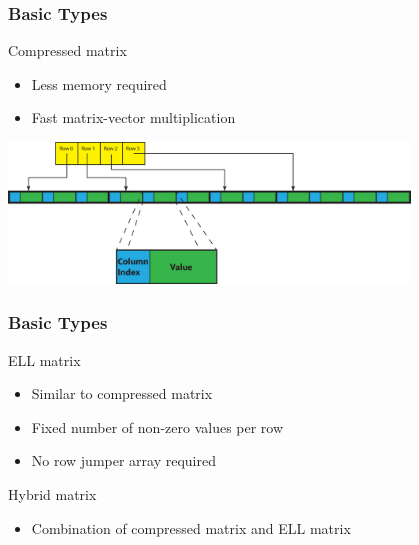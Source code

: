 \begin{frame}
\frametitle{Basic Types}

\begin{block}{Compressed matrix}
  \begin{itemize}
    \item Less memory required
    \item Fast matrix-vector multiplication
  \end{itemize}
  
  \includegraphics[width=0.8\textwidth]{figs/compressed_matrix.eps}
\end{block}

\end{frame}


\begin{frame}
\frametitle{Basic Types}

\begin{block}{ELL matrix}
  \begin{itemize}
    \item Similar to compressed matrix
    \item Fixed number of non-zero values per row
    \item No row jumper array required
  \end{itemize}
\end{block}

\begin{block}{Hybrid matrix}
  \begin{itemize}
    \item Combination of compressed matrix and ELL matrix
  \end{itemize}
\end{block}

\end{frame}



